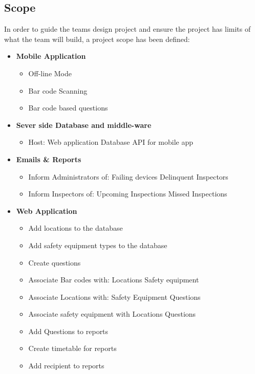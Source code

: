 \documentclass[Letter,11pt]{article}
\begin{document}
	\subsection{Scope}\label{scope}
	In order to guide the teams design project and ensure the project has limits of what the team will build, a project scope has been defined:
	\\
	\begin{minipage}[t]{0.5\textwidth}
		\begin{itemize}
			\item \textbf{Mobile Application}
			\begin{itemize}
				\item Off-line Mode
				\item Bar code Scanning
				\item Bar code based questions
			\end{itemize}
			\item \textbf{Sever side Database and middle-ware}
			\begin{itemize}
				\item Host:
					\subitem Web application
					\subitem Database API for mobile app
			\end{itemize}
			\item\textbf{ Emails \& Reports}
			\begin{itemize}
				\item Inform Administrators of:
					\subitem Failing devices
					\subitem Delinquent Inspectors
				\item Inform Inspectors of:
					\subitem Upcoming Inspections
					\subitem Missed Inspections
			\end{itemize}
		\end{itemize}
	\end{minipage}
	\begin{minipage}[t]{0.5\textwidth}
		\begin{itemize}
			\item \textbf{Web Application}
				\begin{itemize}
					\item Add locations to the database
					\item Add safety equipment types to the database
					\item Create questions
					\item Associate Bar codes with:
						\subitem Locations
						\subitem Safety equipment
					\item Associate Locations with:
						\subitem Safety Equipment
						\subitem Questions
					\item Associate safety equipment with
						\subitem Locations
						\subitem Questions
					\item Add Questions to reports
					\item Create timetable for reports
					\item Add recipient to reports
				\end{itemize}
		\end{itemize}
	\end{minipage}
		
\end{document}
